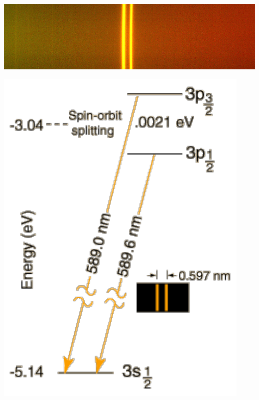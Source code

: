 \documentclass{beamer}
\begin{document}
\begin{frame}
\begin{minipage}[h!]{0.50\textwidth}
\includegraphics[width=\textwidth]{NaLines}

\begin{minipage}[h!]{0.5\textwidth}
\includegraphics[width=\textwidth]{Nadoub}
\end{minipage}
\begin{minipage}[h!]{0.47\textwidth}


\end{minipage}
\end{minipage}
\end{frame}
\end{document}
